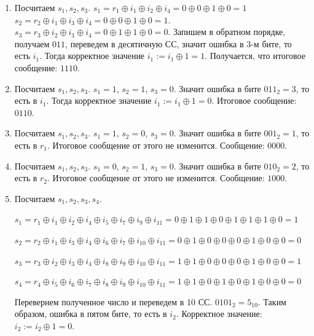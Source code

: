 \begin{enumerate}
    \item Посчитаем $s_1, s_2, s_3$. $s_1 = r_1 \oplus i_1 \oplus i_2 \oplus i_4 = 0 \oplus 0 \oplus 1 \oplus 0 = 1$
    $s_2 = r_2 \oplus i_1 \oplus i_3 \oplus i_4 = 0 \oplus 0 \oplus 1 \oplus 0 = 1$.
    $s_3 = r_3 \oplus i_2 \oplus i_3 \oplus i_4 = 0 \oplus 1 \oplus 1 \oplus 0 = 0$.
    Запишем в обратном порядке, получаем $011$, переведем в десятичную СС, значит ошибка в 3-м бите, то есть $i_1$.
    Тогда корректное значение $i_1 := i_1 \oplus 1 = 1$.
    Получается, что итоговое сообщение: $1110$.

    \item Посчитаем $s_1, s_2, s_3$. $s_1 = 1$, $s_2 = 1$, $s_3= 0$. Значит ошибка
    в бите $011_2 = 3$, то есть в $i_1$. Тогда корректное значение $i_1 := i_1 \oplus 1 = 0$.
    Итоговое сообщение: $0110$.

    \item Посчитаем $s_1, s_2, s_3$. $s_1 = 1$, $s_2 = 0$, $s_3 = 0$. Значит ошибка в
    бите $001_2 = 1$, то есть в $r_1$. Итоговое сообщение от этого не изменится.
    Сообщение: $0000$.

    \item Посчитаем $s_1, s_2, s_3$. $s_1 = 0$, $s_2 = 1$, $s_3 = 0$. Значит ошибка в
    бите $010_2 = 2$, то есть в $r_2$. Итоговое сообщение от этого не изменится.
    Сообщение: $1000$.

    \item Посчитаем $s_1, s_2, s_3, s_4$.
    
    $s_1 = r_1 \oplus i_1 \oplus i_2 \oplus i_4 \oplus i_5 \oplus i_7 \oplus i_9 \oplus i_{11} =
    0 \oplus 1 \oplus 1 \oplus 0 \oplus 1 \oplus 1 \oplus 1 \oplus 0 = 1
    $

    $s_2 = r_2 \oplus i_1 \oplus i_3 \oplus i_4 \oplus i_6 \oplus i_7 \oplus i_{10} \oplus i_{11} =
    0 \oplus 1 \oplus 0 \oplus 0 \oplus 0 \oplus 1 \oplus 0 \oplus 0 = 0
    $

    $
    s_3 = r_3 \oplus i_2 \oplus i_3 \oplus i_4 \oplus i_8 \oplus i_9 \oplus i_{10} \oplus i_{11} =
    1 \oplus 1 \oplus 0 \oplus 0 \oplus 0 \oplus 1 \oplus 0 \oplus 0
    = 1
    $

    $
    s_4 = r_4 \oplus i_5 \oplus i_6 \oplus i_7 \oplus i_8 \oplus i_9 \oplus i_{10} \oplus i_{11} =
    1 \oplus 1 \oplus 0 \oplus 1 \oplus 0 \oplus 1 \oplus 0 \oplus 0 = 0
    $

    Перевернем полученное число и переведем в 10 СС. $0101_2 = 5_{10}$.
    Таким образом, ошибка в пятом бите, то есть в $i_2$.
    Корректное значение: $i_2 := i_2 \oplus 1 = 0$.


\end{enumerate}
